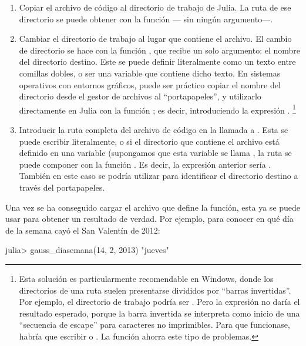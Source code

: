\begin{enumerate}
  \item Copiar el archivo de código  al directorio de trabajo de Julia. La ruta de ese directorio se puede obtener con la función  --- sin ningún argumento---.
  \item Cambiar el directorio de trabajo al lugar que contiene el archivo. El cambio de directorio se hace con la función , que recibe un solo argumento: el nombre del directorio destino. Este se puede definir literalmente como un texto entre comillas dobles, o ser una variable que contiene dicho texto. En sistemas operativos con entornos gráficos, puede ser práctico copiar el nombre del directorio desde el gestor de archivos al ``portapapeles'', y utilizarlo directamente en Julia con la función ; es decir, introduciendo la expresión .%
  \footnote{%
  Esta solución es particularmente recomendable en Windows, donde los directorios de una ruta suelen presentarse divididos por ``barras invertidas''. Por ejemplo, el directorio de trabajo podría ser . Pero la expresión  no daría el resultado esperado, porque la barra invertida se interpreta como inicio de una ``secuencia de escape'' para caracteres no imprimibles. Para que funcionase, habría que escribir  o . La función  ahorra este tipo de problemas.%
  }
  \item Introducir la ruta completa del archivo de código en la llamada a . Esta se puede escribir literalmente, o si el directorio que contiene el archivo está definido en una variable (supongamos que esta variable se llama , la ruta se puede componer con la función . Es decir, la expresión anterior sería . También en este caso se podría utilizar  para identificar el directorio destino a través del portapapeles.
\end{enumerate}

Una vez se ha conseguido cargar el archivo que define la función, esta ya se puede usar para obtener un resultado de verdad. Por ejemplo, para conocer en qué día de la semana cayó el San Valentín de 2012:

\begin{jlconcode}
julia> gauss_diasemana(14, 2, 2013)
"jueves"
\end{jlconcode}

